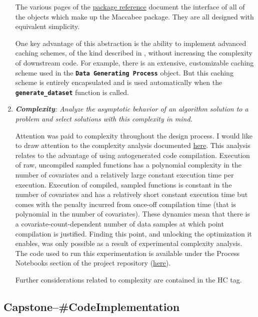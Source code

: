 \documentclass[../main.tex]{subfiles}
\begin{document}
\begin{enumerate}
    The various pages of the \href{\RTDurl/reference.html}{package reference} document the interface of all of the objects which make up the Maccabee package. They are all designed with equivalent simplicity.
    
    One key advantage of this abstraction is the ability to implement advanced caching schemes, of the kind described in , without increasing the complexity of downstream code. For example, there is an extensive, customizable caching scheme used in the \textbf{\texttt{Data Generating Process}} object. But this caching scheme is entirely encapsulated and is used automatically when the \textbf{\lstinline{generate_dataset}} function is called.
    
    \item \textit{\textbf{Complexity}: Analyze the asymptotic behavior of an algorithm solution to a problem and select solutions with this complexity in mind.}
    
    Attention was paid to complexity throughout the design process. I would like to draw attention to the complexity analysis documented \href{\RTDurl/advanced/parallelization.html}{here}. This analysis relates to the advantage of using autogenerated code compilation. Execution of raw, uncompiled sampled functions has a polynomial complexity in the number of covariates and a relatively large constant execution time per execution. Execution of compiled, sampled functions is constant in the number of covariates and has a relatively short constant execution time but comes with the penalty incurred from once-off compilation time (that is polynomial in the number of covariates). These dynamics mean that there is a covariate-count-dependent number of data samples at which point compilation is justified. Finding this point, and unlocking the optimization it enables, was only possible as a result of experimental complexity analysis. The code used to run this experimentation is available under the Process Notebooks section of the project repository (\href{https://github.com/JoshBroomberg/Maccabee/blob/master/Notebooks/Process\%20Notebooks/Code\%20Compilation\%20Validation.ipynb}{here}).
    
    Further considerations related to complexity are contained in the  HC tag. 
    
\end{enumerate}


\subsection*{\textbf{Capstone--\#CodeImplementation}}
\label{lo:CodeImplementation}
\end{document}
